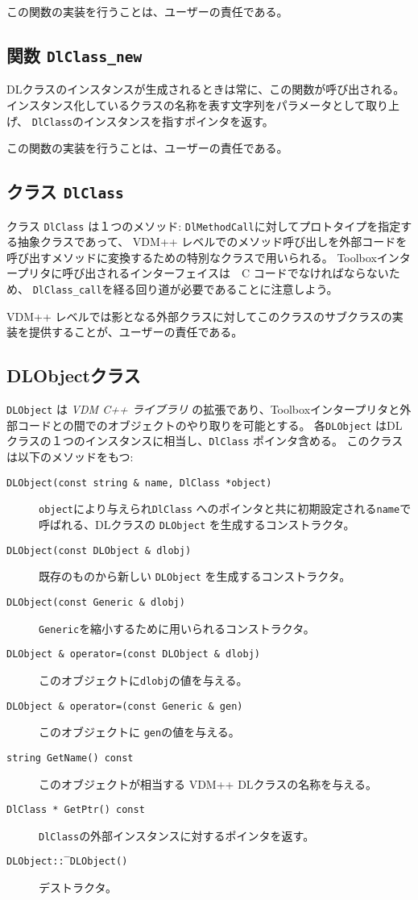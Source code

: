 \documentclass[\pformat,12pt]{jarticle}
\newcommand{\vdmcpplib}{\textit{VDM C++ ライブラリ}}
\begin{document}
この関数の実装を行うことは、ユーザーの責任である。

\subsection{関数 \texttt{DlClass\_new}}
 DLクラスのインスタンスが生成されるときは常に、この関数が呼び出される。
インスタンス化しているクラスの名称を表す文字列をパラメータとして取り上げ、 \texttt{DlClass}のインスタンスを指すポインタを返す。

この関数の実装を行うことは、ユーザーの責任である。

\subsection{クラス \texttt{DlClass}}
クラス \texttt{DlClass} は１つのメソッド: \texttt{DlMethodCall}に対してプロトタイプを指定する抽象クラスであって、 VDM++ レベルでのメソッド呼び出しを外部コードを呼び出すメソッドに変換するための特別なクラスで用いられる。
Toolboxインタープリタに呼び出されるインターフェイスは　C コードでなければならないため、 \texttt{DlClass\_call}を経る回り道が必要であることに注意しよう。

 VDM++ レベルでは影となる外部クラスに対してこのクラスのサブクラスの実装を提供することが、ユーザーの責任である。

\subsection{DLObjectクラス}
 \texttt{DLObject} は {\vdmcpplib} の拡張であり、Toolboxインタープリタと外部コードとの間でのオブジェクトのやり取りを可能とする。
各\texttt{DLObject} はDLクラスの１つのインスタンスに相当し、\texttt{DlClass} ポインタ含める。
このクラスは以下のメソッドをもつ:
\begin{description}
\item[\texttt{DLObject(const string \& name, DlClass *object)}]
\texttt{object}により与えられ\texttt{DlClass} へのポインタと共に初期設定される\texttt{name}で呼ばれる、DLクラスの \texttt{DLObject} を生成するコンストラクタ。
\item[\texttt{DLObject(const DLObject \& dlobj)}]
既存のものから新しい \texttt{DLObject} を生成するコンストラクタ。
\item[\texttt{DLObject(const Generic \& dlobj)}]
 \texttt{Generic}を縮小するために用いられるコンストラクタ。
\item[\texttt{DLObject \& operator=(const DLObject  \& dlobj)}]
このオブジェクトに\texttt{dlobj}の値を与える。
\item[\texttt{DLObject \& operator=(const Generic \& gen)}]
このオブジェクトに \texttt{gen}の値を与える。
\item[\texttt{string GetName() const}]
このオブジェクトが相当する VDM++ DLクラスの名称を与える。
\item[\texttt{DlClass * GetPtr() const}]
\texttt{DlClass}の外部インスタンスに対するポインタを返す。
\item[\texttt{DLObject::‾DLObject()}]
デストラクタ。
\end{description}
\end{document}
